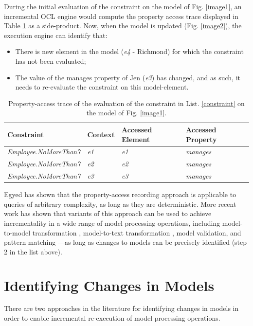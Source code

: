 \documentclass{llncs}
\begin{document}
During the initial evaluation of the constraint on the model of Fig. \ref{image1}, an incremental OCL engine would compute the property access trace displayed in Table \ref{table1} as a side-product. Now, when the model is updated (Fig. \ref{image2}), the execution engine can identify that:

\begin{itemize}
\item There is new element in the model (\emph{e4} - Richmond) for which the constraint has not been evaluated;
\item The value of the manages property of Jen (\emph{e3}) has changed, and as such, it needs to re-evaluate the constraint on this model-element.
\end{itemize}

\begin{table}[h!]
\centering
\caption{Property-access trace of the evaluation of the constraint in List. \ref{constraint} on the model of Fig. \ref{image1}.}
\begin{tabular}{p{4.8cm} p{2.1cm} p{2cm} p{2.1cm}}
\hline 
\textbf{Constraint} & \textbf{Context} & \textbf{Accessed Element} & \textbf{Accessed Property} \\ 
\hline 
\emph{Employee.NoMoreThan7}  & \emph{e1} & \emph{e1} & \emph{manages} \\ 
\emph{Employee.NoMoreThan7}  & \emph{e2} & \emph{e2} & \emph{manages} \\ 
\emph{Employee.NoMoreThan7}  & \emph{e3} & \emph{e3} & \emph{manages} \\ 
\hline 
\end{tabular} 
\label{table1}
\end{table}

Egyed has shown that the property-access recording approach is applicable to queries of arbitrary complexity, as long as they are deterministic. More recent work has shown that variants of this approach can be used to achieve incrementality in a wide range of model processing operations, including model-to-model transformation \cite{jouault2010towards}, model-to-text transformation \cite{ogunyomi2015property}, model validation, and pattern matching \cite{rath2012derived}---as long as changes to models can be precisely identified (step 2 in the list above).

\section{Identifying Changes in Models}
\label{Identifying Changes in Models}
There are two approaches in the literature for identifying changes in models in order to enable incremental re-execution of model processing operations.
\end{document}
